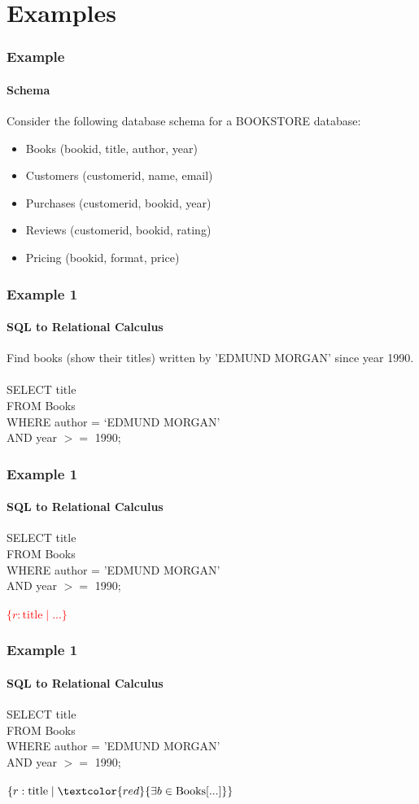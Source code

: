 \documentclass{beamer}
\begin{document}
\section{Examples}
\begin{frame}
  \frametitle{Example}
    \framesubtitle{Schema}
Consider the following database schema for a BOOKSTORE database:
\begin{itemize}
\item Books (bookid, title, author, year)
\item Customers (customerid, name, email)
\item Purchases (customerid, bookid, year)
\item Reviews (customerid, bookid, rating)
\item Pricing (bookid, format, price)
\end{itemize}
\end{frame}
\begin{frame}
  \frametitle{Example 1}
    \framesubtitle{SQL to Relational Calculus}
  Find books (show their titles) written by 'EDMUND MORGAN' since year 1990.\\
  \hfill \\  
  SELECT title\\
  FROM Books\\
  WHERE author = `EDMUND MORGAN'\\
  AND year $>=$ 1990;\\
\end{frame}

\begin{frame}
  \frametitle{Example 1}
    \framesubtitle{SQL to Relational Calculus}
  SELECT title\\
  FROM Books\\
  WHERE author = 'EDMUND MORGAN'\\
  AND year $>=$ 1990;\\
  \hfill \\
  \textcolor{red}{$\{r:\text{title} \mid ... \}$}
\end{frame}

\begin{frame}
  \frametitle{Example 1}
    \framesubtitle{SQL to Relational Calculus}
  SELECT title\\
  FROM Books\\
  WHERE author = 'EDMUND MORGAN'\\
  AND year $>=$ 1990;\\
  \hfill \\
  $\{r:\text{title} \mid \textcolor{red}{\exists b \in \text{Books} [ ... ]} \}$
\end{frame}
\end{document}
